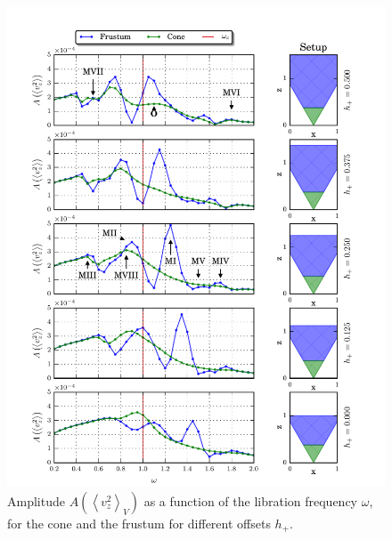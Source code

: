 \begin{figure}[!pt]
  \centering
  \includegraphics{gfx/cone/final/transition.pdf}
  \caption{
      \label{fig:cone:finaltransition}
      Amplitude $A\left(\left<v^2_z\right>_V\right)$ as a function of the libration frequency $\omega$,
      for the cone  and the frustum for different offsets $h_+$.
    }
\end{figure}
\clearpage

